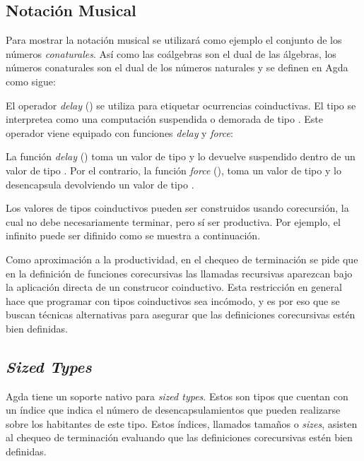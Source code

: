 \subsection{Notación Musical}\label{coind:agda:musical}

Para mostrar la notación musical se utilizará como ejemplo el conjunto de los números \textit{conaturales}. Así como las coálgebras son el dual de las álgebras, los números conaturales son el dual de los números naturales y se definen en Agda como sigue:


El operador \textit{delay} (\AgdaDatatype{$\infty$}) se utiliza para etiquetar ocurrencias coinductivas. El tipo  se interpretea como una computación suspendida o demorada de tipo . Este operador viene equipado con funciones \textit{delay} y \textit{force}:


La función \textit{delay} (\AgdaFunction{$\sharp\_$}) toma un valor de tipo  y lo devuelve suspendido dentro de un valor de tipo . Por el contrario, la función \textit{force} (\AgdaFunction{$\flat$}), toma un valor de tipo  y lo desencapsula devolviendo un valor de tipo .

Los valores de tipos coinductivos pueden ser construidos usando corecursión, la cual no debe necesariamente terminar, pero sí ser productiva. Por ejemplo, el infinito puede ser difinido como se muestra a continuación.


Como aproximación a la productividad, en el chequeo de terminación se pide que en la definición de funciones corecursivas las llamadas recursivas aparezcan bajo la aplicación directa de un construcor coinductivo. Esta restricción en general hace que programar con tipos coinductivos sea incómodo, y es por eso que se buscan técnicas alternativas para asegurar que las definiciones corecursivas estén bien definidas. 

\subsection{\textit{Sized Types}}

Agda tiene un soporte nativo para \textit{sized types}. Estos son tipos que cuentan con un índice que indica el número de desencapsulamientos que pueden realizarse sobre los habitantes de este tipo. Estos índices, llamados tamaños o \textit{sizes}, asisten al chequeo de terminación evaluando que las definiciones corecursivas estén bien definidas. 

